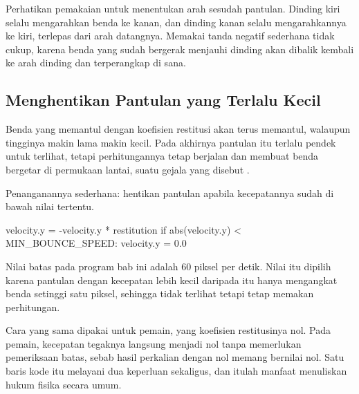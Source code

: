Perhatikan pemakaian  untuk menentukan arah sesudah pantulan.
Dinding kiri selalu mengarahkan benda ke kanan, dan dinding kanan selalu
mengarahkannya ke kiri, terlepas dari arah datangnya. Memakai tanda negatif
sederhana tidak cukup, karena benda yang sudah bergerak menjauhi dinding akan
dibalik kembali ke arah dinding dan terperangkap di sana.

\subsection{Menghentikan Pantulan yang Terlalu Kecil}

Benda yang memantul dengan koefisien restitusi akan terus memantul, walaupun
tingginya makin lama makin kecil. Pada akhirnya pantulan itu terlalu pendek
untuk terlihat, tetapi perhitungannya tetap berjalan dan membuat benda
bergetar di permukaan lantai, suatu gejala yang disebut .

Penanganannya sederhana: hentikan pantulan apabila kecepatannya sudah di bawah
nilai tertentu.

\begin{kodekeluaran}
velocity.y = -velocity.y * restitution
if abs(velocity.y) < MIN_BOUNCE_SPEED:
    velocity.y = 0.0
\end{kodekeluaran}

Nilai batas pada program bab ini adalah 60 piksel per detik. Nilai itu dipilih
karena pantulan dengan kecepatan lebih kecil daripada itu hanya mengangkat
benda setinggi satu piksel, sehingga tidak terlihat tetapi tetap memakan
perhitungan.

\begin{tipsbox}
Cara yang sama dipakai untuk pemain, yang koefisien
restitusinya nol. Pada pemain, kecepatan tegaknya langsung menjadi nol tanpa
memerlukan pemeriksaan batas, sebab hasil perkalian dengan nol memang bernilai
nol. Satu baris kode itu melayani dua keperluan sekaligus, dan itulah manfaat
menuliskan hukum fisika secara umum.
\end{tipsbox}
